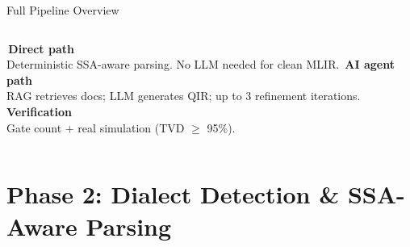 \documentclass[aspectratio=169,10pt]{beamer}
\newcommand{\badge}[2]{%
  \colorbox{#1}{\color{white}\tiny\bfseries\,#2\,}}
\begin{document}
\begin{frame}{Full Pipeline Overview}
\begin{center}
  \end{center}
  \vspace{2pt}
  \begin{columns}[T]
      \badge{qirgreen}{Direct path}
      \smallskip\\
      {\small Deterministic SSA-aware parsing.
      No LLM needed for clean MLIR.}
      \badge{agentpurple}{AI agent path}
      \smallskip\\
      {\small RAG retrieves docs; LLM generates QIR;
      up to 3 refinement iterations.}
      \badge{ssaorange}{Verification}
      \smallskip\\
      {\small Gate count + real simulation (TVD $\ge$ 95\%).}
  \end{columns}
\end{frame}

\section{Phase 2: Dialect Detection \& SSA-Aware Parsing}
\end{document}
